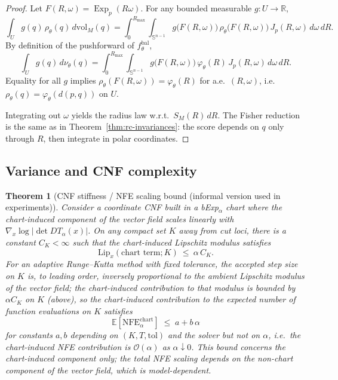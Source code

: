 \documentclass{article}
\newtheorem{theorem}{Theorem}
\theoremstyle{definition}
\theoremstyle{remark}
\newcommand{\RR}{\mathbb{R}}
\newcommand{\SSS}{\mathbb{S}}
\newcommand{\Exp}{\operatorname{Exp}}
\begin{document}
\begin{proof}
Let $F(R,\omega)=\Exp_p(R\omega)$.
For any bounded measurable $g:U\to\RR$,
\[
\int_U g(q)\,\rho_\theta(q)\,d\mathrm{vol}_M(q)
=
\int_0^{R_{\max}}\!\!\int_{\SSS^{n-1}}
g\!\bigl(F(R,\omega)\bigr)\,\rho_\theta\!\bigl(F(R,\omega)\bigr)\,J_p(R,\omega)\,d\omega\,dR.
\]
By definition of the pushforward of $f^{\mathrm{bal}}_\theta$,
\[
\int_U g(q)\,d\nu_\theta(q)
=
\int_0^{R_{\max}}\!\!\int_{\SSS^{n-1}}
g\!\bigl(F(R,\omega)\bigr)\,\varphi_\theta(R)\,J_p(R,\omega)\,d\omega\,dR.
\]
Equality for all $g$ implies $\rho_\theta(F(R,\omega))=\varphi_\theta(R)$ for a.e.\ $(R,\omega)$,
i.e.\ $\rho_\theta(q)=\varphi_\theta(d(p,q))$ on $U$.

Integrating out $\omega$ yields the radius law w.r.t.\ $S_M(R)\,dR$.
The Fisher reduction is the same as in Theorem~\ref{thm:rc-invariances}:
the score depends on $q$ only through $R$, then integrate in polar coordinates.
\end{proof}





\subsection{Variance and CNF complexity}
\label{app:variance_cnf}





\begin{theorem}[CNF stiffness / NFE scaling bound (informal version used in experiments)]
\label{thm:cnf}
Consider a coordinate CNF built in a bExp$_\alpha$ chart where the chart-induced component of the
vector field scales linearly with $\nabla_x\log|\det DT_\alpha(x)|$. On any compact set $K$ away from
cut loci, there is a constant $C_K<\infty$ such that the chart-induced Lipschitz modulus satisfies
\[
\mathrm{Lip}_x(\text{chart term};K)\ \le\ \alpha\,C_K.
\]
For an adaptive Runge--Kutta method with fixed tolerance, the accepted step
size on $K$ is, to leading order, inversely proportional to the ambient
Lipschitz modulus of the vector field; the chart-induced contribution to that
modulus is bounded by $\alpha C_K$ on $K$ (above), so the chart-induced
contribution to the expected number of function evaluations on $K$ satisfies
\[
\mathbb E[\mathrm{NFE}^{\mathrm{chart}}_\alpha]\;\leq\; a+b\,\alpha
\]
for constants $a,b$ depending on $(K,T,\mathrm{tol})$ and the solver but not
on $\alpha$, i.e.\ the chart-induced NFE contribution is $\mathcal O(\alpha)$
as $\alpha\downarrow 0$. This bound concerns the chart-induced component
only; the total NFE scaling depends on the non-chart component of the vector
field, which is model-dependent.
\end{theorem}
\end{document}
